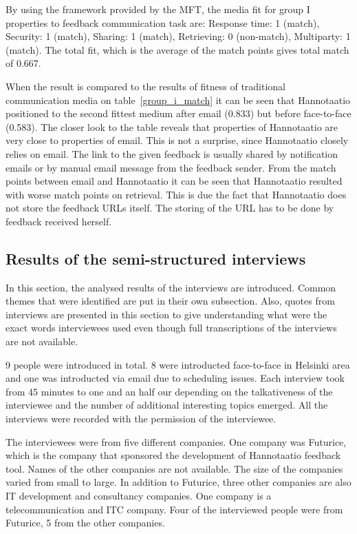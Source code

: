 \documentclass[english,12pt,a4paper,pdftex]{article}
\begin{document}
By using the framework provided by the \ac{MFT}, the media fit for group I properties to feedback communication task are: Response time: 1 (match), Security: 1 (match), Sharing: 1 (match), Retrieving: 0 (non-match), Multiparty: 1 (match). The total fit, which is the average of the match points gives total match of 0.667.

When the result is compared to the results of fitness of traditional communication media on table~\ref{group_i_match} it can be seen that Hannotaatio positioned to the second fittest medium after email (0.833) but before face-to-face (0.583). The closer look to the table reveals that properties of Hannotaatio are very close to properties of email. This is not a surprise, since Hannotaatio closely relies on email. The link to the given feedback is usually shared by notification emails or by manual email message from the feedback sender. From the match points between email and Hannotaatio it can be seen that Hannotaatio resulted with worse match points on retrieval. This is due the fact that Hannotaatio does not store the feedback \acs{URL}s itself. The storing of the \ac{URL} has to be done by feedback received herself.

\subsection{Results of the semi-structured interviews}

In this section, the analysed results of the interviews are introduced. Common themes that were identified are put in their own subsection. Also, quotes from interviews are presented in this section to give understanding what were the exact words interviewees used even though full transcriptions of the interviews are not available.

9 people were introduced in total. 8 were introducted face-to-face in Helsinki area and one was introducted via email due to scheduling issues. Each interview took from 45 minutes to one and an half our depending on the talkativeness of the interviewee and the number of additional interesting topics emerged. All the interviews were recorded with the permission of the interviewee. 

The interviewees were from five different companies. One company was Futurice, which is the company that sponsored the development of Hannotaatio feedback tool. Names of the other companies are not available. The size of the companies varied from small to large. In addition to Futurice, three other companies are also IT development and consultancy companies. One company is a telecommunication and ITC company. Four of the interviewed people were from Futurice, 5 from the other companies.
\end{document}
